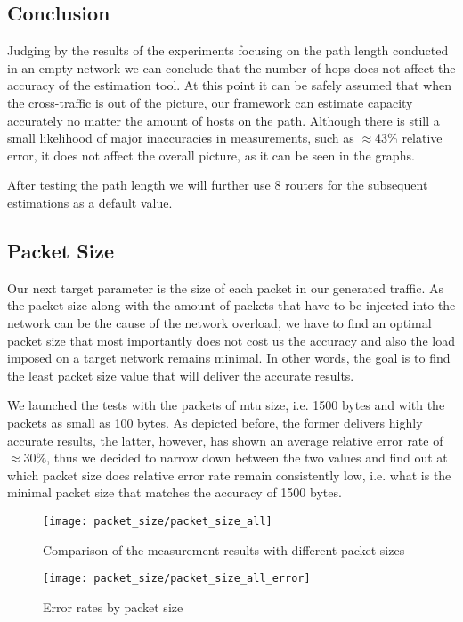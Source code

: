 \subsection*{Conclusion}
Judging by the results of the experiments focusing on the path length conducted in an empty network we can conclude that the number of hops does not affect the accuracy of the estimation tool. At this point it can be safely assumed that when the cross-traffic is out of the picture, our framework can estimate capacity accurately no matter the amount of hosts on the path. Although there is still a small likelihood of major inaccuracies in measurements, such as $\approx$43\% relative error, it does not affect the overall picture, as it can be seen in the graphs.

After testing the path length we will further use 8 routers for the subsequent estimations as a default value.


\subsection{Packet Size}
Our next target parameter is the size of each packet in our generated traffic. 
As the packet size along with the amount of packets that have to be injected into the network can be the cause of the network overload, we have to find an optimal packet size that most importantly does not cost us the accuracy and also the load imposed on a target network remains minimal. In other words, the goal is to find the least packet size value that will deliver the accurate results.

We launched the tests with the packets of \ac{mtu} size, i.e. 1500 bytes and with the packets as small as 100 bytes. As depicted before, the former delivers highly accurate results, the latter, however, has shown an average relative error rate of $\approx$30\%, thus we decided to narrow down between the two values and find out at which packet size does relative error rate remain consistently low, i.e. what is the minimal packet size that matches the accuracy of 1500 bytes. 

\begin{figure}[t]
 \centering
 \texttt{[image: packet\_size/packet\_size\_all]}
 \caption{Comparison of the measurement results with different packet sizes}
 \label{packet_size_all}
\end{figure}


\begin{figure}[H]
 \centering
 \texttt{[image: packet\_size/packet\_size\_all\_error]}
 \caption{Error rates by packet size}
 \label{packet_size_all_error}
\end{figure}

